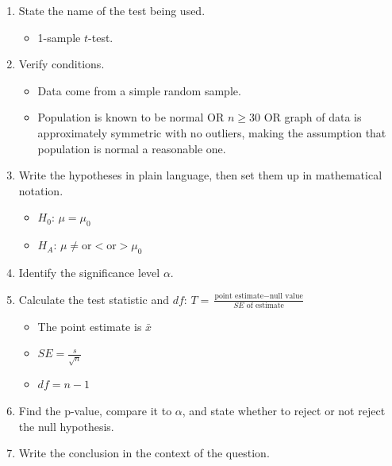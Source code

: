 \begin{termBox}{
\begin{enumerate}
\setlength{\itemsep}{0mm}
\item State the name of the test being used.\vspace{-1.5mm}
\begin{itemize}
\setlength{\itemsep}{0mm}
\item 1-sample $t$-test.
\end{itemize}
\item Verify conditions.\vspace{-1.5mm}
\begin{itemize}
\setlength{\itemsep}{0mm}
\item Data come from a simple random sample.
\item Population is known to be normal OR $n\ge 30$ OR graph of data is approximately symmetric with no outliers, making the assumption that population is normal a reasonable one.
\end{itemize}
\item Write the hypotheses in plain language, then set them up in mathematical notation.\vspace{-1.5mm}
\begin{itemize}
\setlength{\itemsep}{0mm}
\item $H_0$: $\mu = \mu_0$
\item $H_A$: $\mu \ne \text{or} < \text{or} > \mu_0$
\end{itemize}
\item Identify the significance level $\alpha$.
\item Calculate the test statistic and $df$: $T = \frac{\text{point estimate} - \text{null value}}{SE \text{ of estimate}}$
\begin{itemize}
\setlength{\itemsep}{0mm}
\item The point estimate is $\bar{x}$
\item $SE = \frac{s}{\sqrt{n}}$
\item $df=n-1$
\end{itemize}
\item Find the p-value, compare it to $\alpha$, and state whether to reject or not reject the null hypothesis.
\item Write the conclusion in the context of the question.
\end{enumerate}}
\end{termBox}

